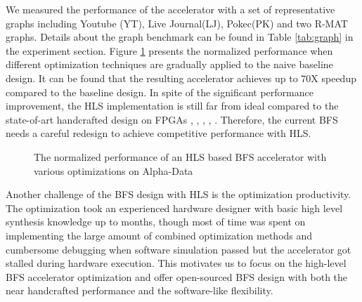 We measured the performance of the accelerator with a set of representative graphs 
including Youtube (YT), Live Journal(LJ), Pokec(PK) and two R-MAT graphs. Details about the 
graph benchmark can be found in Table \ref{tab:graph} in the experiment section. 
Figure \ref{fig:opt-performance} presents the normalized performance
when different optimization techniques are gradually applied to the naive baseline design.
It can be found that the resulting accelerator achieves up to 70X speedup
compared to the baseline design. In spite of the significant performance improvement, 
the HLS implementation is still far from ideal compared to the state-of-art 
handcrafted design on FPGAs \cite{betkaoui2012reconfigurable}, 
\cite{attia2014cygraph}, \cite{zhang2017boosting}, \cite{nurvitadhi2014graphgen},
\cite{dai2016fpgp}. Therefore, the current BFS needs a careful redesign to achieve 
competitive performance with HLS. 

\begin{figure}
    \caption{The normalized performance of an HLS based BFS accelerator with various optimizations on Alpha-Data}
\label{fig:opt-performance}
\vspace{-1em}
\end{figure}

Another challenge of the BFS design with HLS is the optimization productivity. 
The optimization took an experienced hardware designer 
with basic high level synthesis knowledge up to months, though most of time was 
spent on implementing the large amount of combined optimization methods and cumbersome
debugging when software simulation passed but the accelerator got stalled 
during hardware execution. This motivates us to focus on the high-level BFS 
accelerator optimization and offer open-sourced BFS design with both 
the near handcrafted performance and the software-like flexibility.
 
%

